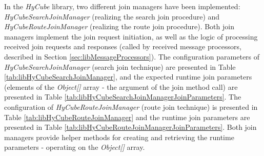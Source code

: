 In the \emph{HyCube} library, two different join managers have been implemented: \emph{HyCubeSearchJoinManager} (realizing the search join procedure) and \emph{HyCubeRouteJoinManager} (realizing the route join procedure). Both join managers implement the join request initiation, as well as the logic of processing received join requests and responses (called by received message processors, described in Section \ref{sec:libMessageProcessors}). The configuration parameters of \emph{HyCubeSearchJoinManager} (search join technique) are presented in Table \ref{tab:libHyCubeSearchJoinManager}, and the expected runtime join parameters (elements of the \emph{Object[]} array - the argument of the join method call) are presented in Table \ref{tab:libHyCubeSearchJoinManagerJoinParameters}. The configuration of \emph{HyCubeRouteJoinManager} (route join technique) is presented in Table \ref{tab:libHyCubeRouteJoinManager} and the runtime join parameters are presented in Table \ref{tab:libHyCubeRouteJoinManagerJoinParameters}. Both join managers provide helper methods for creating and retrieving the runtime parameters - operating on the \emph{Object[]} array.


